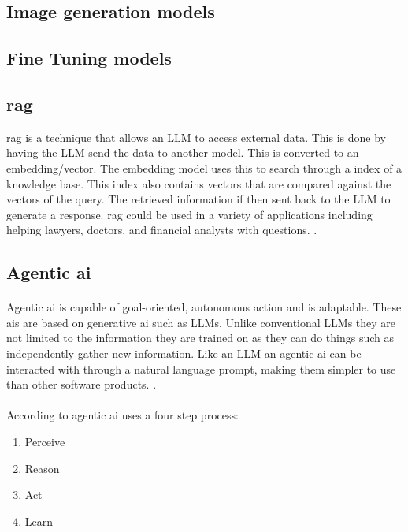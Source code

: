 \subsection{Image generation models}
\paragraph{}

\subsection{Fine Tuning models}

\subsection{\acrfull{rag}}
\acrshort{rag} is a technique that allows an LLM to access external data. This is done by having the LLM send the data to another model. This is converted to an embedding/vector. The embedding model uses this to search through a index of a knowledge base. This index also contains vectors that are compared against the vectors of the query. The retrieved information if then sent back to the LLM to generate a response. \acrshort{rag} could be used in a variety of applications including helping lawyers, doctors, and financial analysts with questions. \autocite{merritt_what_2025}.

\subsection{Agentic \acrshort{ai}}
\paragraph{}Agentic \acrshort{ai} is capable of goal-oriented, autonomous action and is adaptable. These \acrshort{ai}s are based on generative \acrshort{ai} such as LLMs. Unlike conventional LLMs they are not limited to the information they are trained on as they can do things such as independently gather new information. Like an LLM an agentic \acrshort{ai} can be interacted with through a natural language prompt, making them simpler to use than other software products. \autocite{noauthor_what_2025}.

\paragraph{}According to \textcite{pounds_what_2024} agentic \acrshort{ai} uses a four step process:
\begin{enumerate}
    \item Perceive
    \item Reason
    \item Act
    \item Learn
\end{enumerate}

